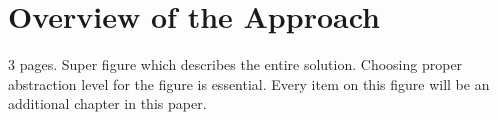 \chapter{Overview of the Approach}
3 pages. Super figure which describes the entire solution. Choosing proper abstraction level for the figure is essential. Every item on this figure will be an additional chapter in this paper.
